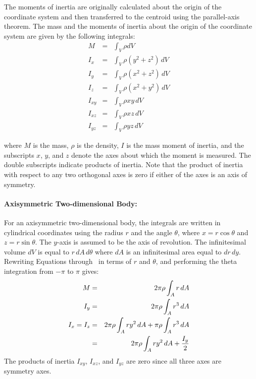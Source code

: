 The moments of inertia are originally calculated about the origin of the
coordinate system and then transferred to the centroid using the
parallel-axis theorem. The mass and the moments of inertia about the
origin of the coordinate system are given by the following integrals:
\begin{eqnarray}
 M      &=& \int_V \rho dV                         \label{V}\\
 I_x    &=& \int_V \rho\left(y^2 + z^2\right)\,dV \label{IX}\\
 I_y    &=& \int_V \rho\left(x^2 + z^2\right)\,dV \label{IY}\\
 I_z    &=& \int_V \rho\left(x^2 + y^2\right)\,dV \label{IZ}\\
 I_{xy} &=& \int_V \rho xy\,dV                    \label{IXY}\\
 I_{xz} &=& \int_V \rho xz\,dV                    \label{IXZ}\\
 I_{yz} &=& \int_V \rho yz\,dV                    \label{IYZ}
\end{eqnarray}

where $M$ is the mass, $\rho$ is the density, $I$ is the mass moment
of inertia, and the subscripts $x$, $y$, and $z$ denote the axes about
which the moment is measured.  The double subscripts indicate products
of inertia.  Note that the product of inertia with respect to any two
orthogonal axes is zero if either of the axes is an axis of symmetry.

\paragraph{Axisymmetric Two-dimensional Body:}
For an axisymmetric two-dimensional body, the integrals are written in
cylindrical coordinates using the radius $r$ and the angle $\theta$,
where $x = r\cos\theta$ and $z = r\sin\theta$.  The $y$-axis is assumed
to be the axis of revolution.  The infinitesimal volume $dV$ is equal to
$r\,dA\,d\theta$ where $dA$ is an infinitesimal area equal to $dr\,dy$.
Rewriting Equations  through~ in terms of
$r$ and $\theta$, and performing the theta integration from $-\pi$ to
$\pi$ gives:
\begin{eqnarray}
M   &=& 2\pi\rho\int_A r\,dA   \\
I_y &=& 2\pi\rho\int_A r^3\,dA   \\
I_x = I_z &=& 2\pi\rho\int_A r y^2\,dA + \pi\rho \int_A r^3\,dA\nonumber \\
    &=& 2\pi\rho\int_A r y^2\,dA + {I_y\over2}
\end{eqnarray}
The products of inertia $I_{xy}$, $I_{xz}$, and $I_{yz}$ are zero since
all three axes are symmetry axes.

